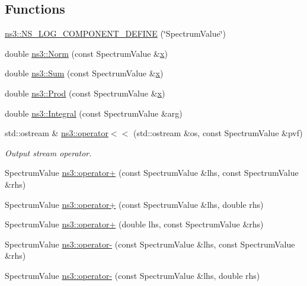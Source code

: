 \subsection*{Functions}
\begin{DoxyCompactItemize}
\item 
\hyperlink{namespacens3_abfca17ecef447d63fa113b234de05011}{ns3\+::\+N\+S\+\_\+\+L\+O\+G\+\_\+\+C\+O\+M\+P\+O\+N\+E\+N\+T\+\_\+\+D\+E\+F\+I\+NE} (\char`\"{}Spectrum\+Value\char`\"{})
\item 
double \hyperlink{namespacens3_a929727240faf05726072f417f657f654}{ns3\+::\+Norm} (const Spectrum\+Value \&\hyperlink{lte__link__budget__x2__handover__measures_8m_a9336ebf25087d91c818ee6e9ec29f8c1}{x})
\item 
double \hyperlink{namespacens3_afad5475661952172fe6ef1260360dad8}{ns3\+::\+Sum} (const Spectrum\+Value \&\hyperlink{lte__link__budget__x2__handover__measures_8m_a9336ebf25087d91c818ee6e9ec29f8c1}{x})
\item 
double \hyperlink{namespacens3_ada030e93e711d4b9ea379c57cf0c5e4b}{ns3\+::\+Prod} (const Spectrum\+Value \&\hyperlink{lte__link__budget__x2__handover__measures_8m_a9336ebf25087d91c818ee6e9ec29f8c1}{x})
\item 
double \hyperlink{namespacens3_a3dd3817567502f8bc77b04e47134c070}{ns3\+::\+Integral} (const Spectrum\+Value \&arg)
\item 
std\+::ostream \& \hyperlink{namespacens3_a1e898cfd2c2fed3fdbd465a5c1b9f69d}{ns3\+::operator$<$$<$} (std\+::ostream \&os, const Spectrum\+Value \&pvf)
\begin{DoxyCompactList}\small\item\em Output stream operator. \end{DoxyCompactList}\item 
Spectrum\+Value \hyperlink{namespacens3_a05ef9bc111855912424c328b054191a5}{ns3\+::operator+} (const Spectrum\+Value \&lhs, const Spectrum\+Value \&rhs)
\item 
Spectrum\+Value \hyperlink{namespacens3_a23492c76e106f19c2fd3f576e5f3803d}{ns3\+::operator+} (const Spectrum\+Value \&lhs, double rhs)
\item 
Spectrum\+Value \hyperlink{namespacens3_a2c84ebe8080547e6147d5d1d74fab7e5}{ns3\+::operator+} (double lhs, const Spectrum\+Value \&rhs)
\item 
Spectrum\+Value \hyperlink{namespacens3_a50a5430fa6182dc6973ad107685fc889}{ns3\+::operator-\/} (const Spectrum\+Value \&lhs, const Spectrum\+Value \&rhs)
\item 
Spectrum\+Value \hyperlink{namespacens3_a7eac5c8933a2ccf4ca2351263ed3db2f}{ns3\+::operator-\/} (const Spectrum\+Value \&lhs, double rhs)

\end{DoxyCompactItemize}
